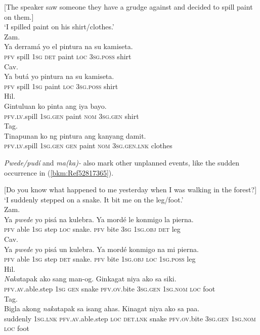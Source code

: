 \documentclass[output=paper,colorlinks,citecolor=brown]{langscibook}
\begin{document}
\ea
{\label{bkm:Ref52816675}[The speaker saw someone they have a grudge against and decided to spill paint on them.]}\\
{‘I spilled paint on his shirt/clothes.’}\\
\ea
{Zam.}\\
\gll Ya derramá yo el pintura na su kamiseta.\\
     \textsc{pfv} spill 1\textsc{sg} \textsc{det} paint \textsc{loc} 3\textsc{sg.poss} shirt\\
\ex
{Cav.}\\
\gll Ya butá yo pintura na su kamiseta.\\
     \textsc{pfv} spill \textsc{1sg} paint \textsc{loc} 3\textsc{sg.poss} shirt\\
\ex
{Hil.}\\
\gll Gintuluan ko pinta ang iya bayo.\\
     \textsc{pfv}.\textsc{lv}.spill \textsc{1sg.gen} paint \textsc{nom} 3\textsc{sg.gen} shirt\\
\ex
{Tag.}\\
\gll Tinapunan ko ng pintura ang kanyang damit.\\
     \textsc{pfv}.\textsc{lv}.spill \textsc{1sg.gen} \textsc{gen} paint \textsc{nom} 3\textsc{sg.gen.lnk} clothes\\
\z
\z

{\textit{Pwede/pudí} and \textit{ma(ka)-} also mark other unplanned events, like the sudden occurrence in (\ref{bkm:Ref52817365})}. 


\ea
{\label{bkm:Ref52817365}[Do you know what happened to me yesterday when I was walking in the forest?]}\\
{‘I suddenly stepped on a snake. It bit me on the leg/foot.’}\\
\ea
{Zam.}\\
\gll Ya \textit{pwede} yo pisá na kulebra. Ya mordé le konmigo la pierna.\\
     \textsc{pfv} able \textsc{1sg} step \textsc{loc} snake. \textsc{pfv} bite 3\textsc{sg} 1\textsc{sg.obj} \textsc{det} leg\\
\ex
{Cav.}\\
\gll Ya \textit{pwede} yo pisá un kulebra. Ya mordé konmigo na mi pierna.\\
     \textsc{pfv} able \textsc{1sg} step \textsc{det} snake. \textsc{pfv} bite 1\textsc{sg.obj} \textsc{loc} 1\textsc{sg}.\textsc{poss} leg\\
\ex
{Hil.}\\
\gll \textit{Naka}tapak ako sang man-og. Ginkagat niya ako sa siki.\\
     \textsc{pfv.av.}able.step \textsc{1sg} \textsc{gen} snake \textsc{pfv.ov.}bite 3\textsc{sg.gen} 1\textsc{sg.nom} \textsc{loc} foot\\
\ex
{Tag.}\\
\gll Bigla akong \textit{naka}tapak sa isang ahas. Kinagat niya ako sa paa.\\
     suddenly \textsc{1sg.lnk} \textsc{pfv.av.}able.step \textsc{loc} \textsc{det.lnk} snake \textsc{pfv}.\textsc{ov.}bite 3\textsc{sg.gen} 1\textsc{sg.nom} \textsc{loc} foot\\
\z
\z
\end{document}
